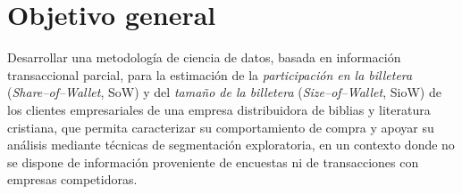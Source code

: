 

\section{Objetivo general}
Desarrollar una metodología de ciencia de datos, basada en información transaccional parcial, para la estimación de la \emph{participación en la billetera} (\emph{Share--of--Wallet}, SoW) y del \emph{tamaño de la billetera} (\emph{Size--of--Wallet}, SioW) de los clientes empresariales de una empresa distribuidora de biblias y literatura cristiana, que permita caracterizar su comportamiento de compra y apoyar su análisis mediante técnicas de segmentación exploratoria, en un contexto donde no se dispone de información proveniente de encuestas ni de transacciones con empresas competidoras.
